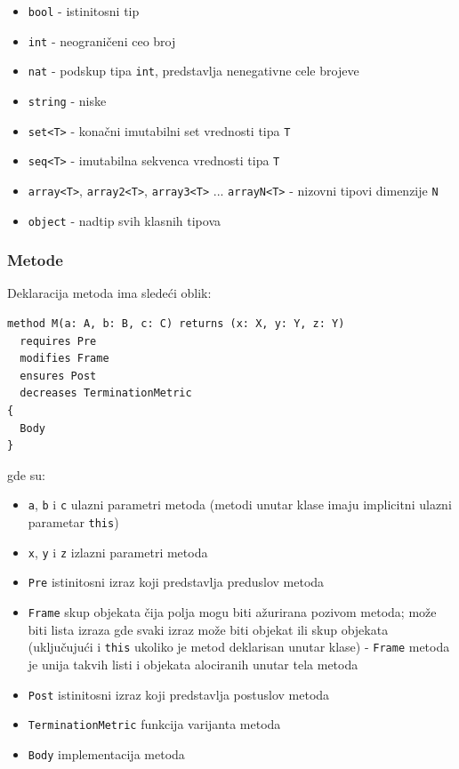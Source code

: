 \begin{itemize}
\tightlist
\item
  \texttt{bool} - istinitosni tip
\item
  \texttt{int} - neograničeni ceo broj
\item
  \texttt{nat} - podskup tipa \texttt{int}, predstavlja nenegativne cele brojeve
\item
  \texttt{string} - niske
\item
  \texttt{set\textless{}T\textgreater{}} - konačni imutabilni set vrednosti tipa \texttt{T}
\item
  \texttt{seq\textless{}T\textgreater{}} - imutabilna sekvenca vrednosti tipa \texttt{T}
\item
  \texttt{array\textless{}T\textgreater{}}, \texttt{array2\textless{}T\textgreater{}}, \texttt{array3\textless{}T\textgreater{}} ... \texttt{arrayN\textless{}T\textgreater{}} - nizovni tipovi dimenzije \texttt{N}
\item
  \texttt{object} - nadtip svih klasnih tipova
\end{itemize}

\subsubsection{Metode}\label{metode}

Deklaracija metoda ima sledeći oblik:

\begin{verbatim}
method M(a: A, b: B, c: C) returns (x: X, y: Y, z: Y)
  requires Pre
  modifies Frame
  ensures Post
  decreases TerminationMetric
{
  Body
}
\end{verbatim}

gde su:

\begin{itemize}
\tightlist
\item
  \texttt{a}, \texttt{b} i \texttt{c} ulazni parametri metoda (metodi unutar klase imaju implicitni ulazni parametar \texttt{this})
\item
  \texttt{x}, \texttt{y} i \texttt{z} izlazni parametri metoda
\item
  \texttt{Pre} istinitosni izraz koji predstavlja preduslov metoda
\item
  \texttt{Frame} skup objekata čija polja mogu biti ažurirana pozivom metoda; može biti lista izraza gde svaki izraz može biti objekat ili skup objekata (uključujući i \texttt{this} ukoliko je metod deklarisan unutar klase) - \texttt{Frame} metoda je unija takvih listi i objekata alociranih unutar tela metoda
\item
  \texttt{Post} istinitosni izraz koji predstavlja postuslov metoda
\item
  \texttt{TerminationMetric} funkcija varijanta metoda
\item
  \texttt{Body} implementacija metoda
\end{itemize}

